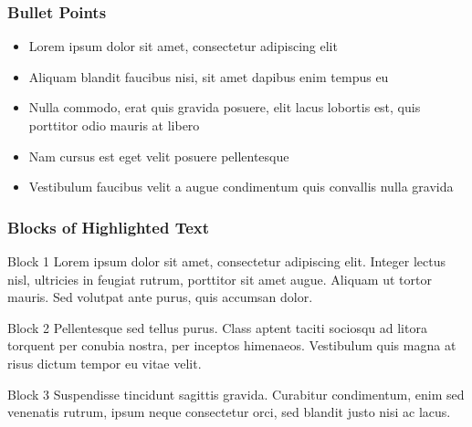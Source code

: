 \documentclass{beamer}
\begin{document}

\begin{frame}
\frametitle{Bullet Points}
\begin{itemize}
\item Lorem ipsum dolor sit amet, consectetur adipiscing elit
\item Aliquam blandit faucibus nisi, sit amet dapibus enim tempus eu
\item Nulla commodo, erat quis gravida posuere, elit lacus lobortis est, quis porttitor odio mauris at libero
\item Nam cursus est eget velit posuere pellentesque
\item Vestibulum faucibus velit a augue condimentum quis convallis nulla gravida
\end{itemize}
\end{frame}


\begin{frame}
\frametitle{Blocks of Highlighted Text}
\begin{block}{Block 1}
Lorem ipsum dolor sit amet, consectetur adipiscing elit. Integer lectus nisl, ultricies in feugiat rutrum, porttitor sit amet augue. Aliquam ut tortor mauris. Sed volutpat ante purus, quis accumsan dolor.
\end{block}

\begin{block}{Block 2}
Pellentesque sed tellus purus. Class aptent taciti sociosqu ad litora torquent per conubia nostra, per inceptos himenaeos. Vestibulum quis magna at risus dictum tempor eu vitae velit.
\end{block}

\begin{block}{Block 3}
Suspendisse tincidunt sagittis gravida. Curabitur condimentum, enim sed venenatis rutrum, ipsum neque consectetur orci, sed blandit justo nisi ac lacus.
\end{block}
\end{frame}

\end{document}
